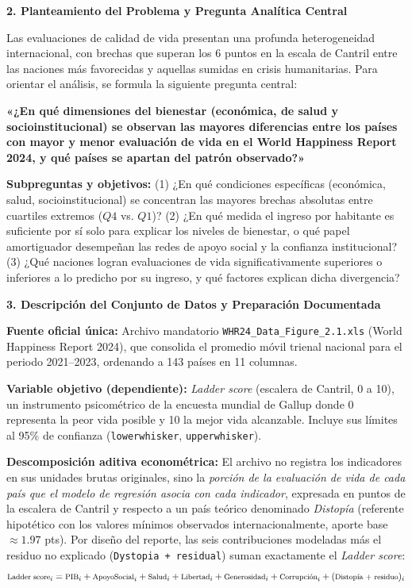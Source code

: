 \documentclass[9pt,a4paper]{article}
\newcommand{\customsection}[1]{%
  \vspace{0.2em}%
  {\small\bfseries\color{whrmagenta}#1}%
  \vspace{0.05em}\par%
}
\begin{document}
\customsection{2. Planteamiento del Problema y Pregunta Analítica Central}
Las evaluaciones de calidad de vida presentan una profunda heterogeneidad internacional, con brechas que superan los 6 puntos en la escala de Cantril entre las naciones más favorecidas y aquellas sumidas en crisis humanitarias. Para orientar el análisis, se formula la siguiente pregunta central:

\vspace{0.1em}
\begin{center}
\colorbox{lightbg}{\parbox{0.98\textwidth}{%
\footnotesize\bfseries\textcolor{darkslate}{«¿En qué dimensiones del bienestar (económica, de salud y socioinstitucional) se observan las mayores diferencias entre los países con mayor y menor evaluación de vida en el World Happiness Report 2024, y qué países se apartan del patrón observado?»}%
}}
\end{center}
\vspace{0.1em}

\textbf{Subpreguntas y objetivos:} (1) ¿En qué condiciones específicas (económica, salud, socioinstitucional) se concentran las mayores brechas absolutas entre cuartiles extremos ($Q4$ vs. $Q1$)? (2) ¿En qué medida el ingreso por habitante es suficiente por sí solo para explicar los niveles de bienestar, o qué papel amortiguador desempeñan las redes de apoyo social y la confianza institucional? (3) ¿Qué naciones logran evaluaciones de vida significativamente superiores o inferiores a lo predicho por su ingreso, y qué factores explican dicha divergencia?

\customsection{3. Descripción del Conjunto de Datos y Preparación Documentada}
\textbf{Fuente oficial única:} Archivo mandatorio \texttt{WHR24\_Data\_Figure\_2.1.xls} (World Happiness Report 2024), que consolida el promedio móvil trienal nacional para el periodo 2021--2023, ordenando a 143 países en 11 columnas.

\textbf{Variable objetivo (dependiente):} \textit{Ladder score} (escalera de Cantril, 0 a 10), un instrumento psicométrico de la encuesta mundial de Gallup donde 0 representa la peor vida posible y 10 la mejor vida alcanzable. Incluye sus límites al 95\% de confianza (\texttt{lowerwhisker}, \texttt{upperwhisker}).

\textbf{Descomposición aditiva econométrica:} El archivo no registra los indicadores en sus unidades brutas originales, sino la \textit{porción de la evaluación de vida de cada país que el modelo de regresión asocia con cada indicador}, expresada en puntos de la escalera de Cantril y respecto a un país teórico denominado \textit{Distopía} (referente hipotético con los valores mínimos observados internacionalmente, aporte base $\approx 1.97$ pts). Por diseño del reporte, las seis contribuciones modeladas más el residuo no explicado (\texttt{Dystopia + residual}) suman exactamente el \textit{Ladder score}:
\begin{equation*}
\footnotesize
\text{Ladder score}_i = \text{PIB}_i + \text{ApoyoSocial}_i + \text{Salud}_i + \text{Libertad}_i + \text{Generosidad}_i + \text{Corrupción}_i + (\text{Distopía + residuo})_i
\end{equation*}
\end{document}
